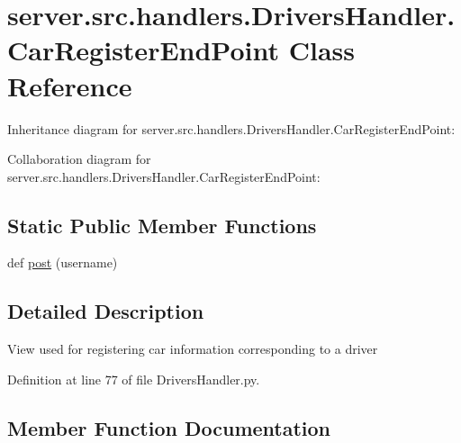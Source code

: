 \hypertarget{classserver_1_1src_1_1handlers_1_1_drivers_handler_1_1_car_register_end_point}{}\section{server.\+src.\+handlers.\+Drivers\+Handler.\+Car\+Register\+End\+Point Class Reference}
\label{classserver_1_1src_1_1handlers_1_1_drivers_handler_1_1_car_register_end_point}


Inheritance diagram for server.\+src.\+handlers.\+Drivers\+Handler.\+Car\+Register\+End\+Point\+:


Collaboration diagram for server.\+src.\+handlers.\+Drivers\+Handler.\+Car\+Register\+End\+Point\+:
\subsection*{Static Public Member Functions}
\begin{DoxyCompactItemize}
\item 
def \hyperlink{classserver_1_1src_1_1handlers_1_1_drivers_handler_1_1_car_register_end_point_affed6ad1120741bf2ca57294c7b4beab}{post} (username)
\end{DoxyCompactItemize}


\subsection{Detailed Description}
\begin{DoxyVerb}View used for registering car information corresponding to a driver\end{DoxyVerb}
 

Definition at line 77 of file Drivers\+Handler.\+py.



\subsection{Member Function Documentation}
